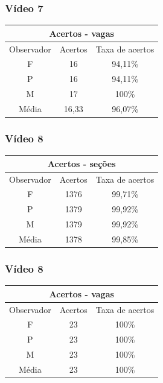 \documentclass{beamer}
\begin{document}
\begin{frame}
\frametitle{Vídeo 7}

\begin{center}
\begin{tabular}{|c||c||c|}
\hline
\multicolumn{3}{|c|}{Acertos - vagas}  \\ \hline \hline
Observador & Acertos & Taxa de acertos \\ \hline
F & 16 & 94,11\% \\  \hline
P & 16 & 94,11\% \\ \hline
M & 17 & 100\% \\ \hline
Média & 16,33 & 96,07\% \\
\hline
\end{tabular}
\end{center}
\end{frame}

\begin{frame}
	\frametitle{Vídeo 8}
\begin{center}
\begin{tabular}{|c||c||c|}
\hline
\multicolumn{3}{|c|}{Acertos - seções}  \\ \hline\hline
Observador & Acertos & Taxa de acertos \\ \hline
F & 1376 & 99,71\% \\  \hline
P & 1379 & 99,92\% \\ \hline
M & 1379 & 99,92\% \\ \hline
Média & 1378 & 99,85\% \\
\hline
\end{tabular}
\end{center}
\end{frame}

\begin{frame}
\frametitle{Vídeo 8}
\begin{center}
\begin{tabular}{|c||c||c|}
\hline
\multicolumn{3}{|c|}{Acertos - vagas}  \\ \hline \hline
Observador & Acertos & Taxa de acertos \\ \hline
F & 23 & 100\% \\  \hline
P & 23 & 100\% \\ \hline
M & 23 & 100\% \\ \hline
Média & 23 & 100\% \\
\hline
\end{tabular}
\end{center}
\end{frame}
\end{document}
